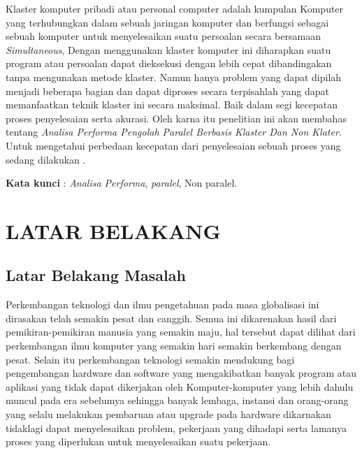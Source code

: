 \documentclass{jtetiproposalskripsi}
\begin{document}
\cover

\approvalpage


\begin{abstractind}
Klaster komputer pribadi atau personal computer adalah kumpulan Komputer yang terhubungkan dalam sebuah jaringan komputer dan berfungsi sebagai sebuah komputer untuk menyelesaikan suatu persoalan secara bersamaan \emph{Simultaneous}, Dengan menggunakan klaster komputer ini diharapkan suatu program atau persoalan dapat dieksekusi dengan lebih cepat dibandingakan tanpa mengunakan metode klaster. Namun hanya problem yang dapat dipilah menjadi beberapa bagian dan dapat diproses secara terpisahlah yang dapat memanfaatkan teknik klaster ini secara maksimal. Baik dalam segi kecepatan proses penyelesaian serta akurasi. Oleh karna itu penelitian ini akan membahas tentang \emph{Analisa Performa Pengolah Paralel Berbasis Klaster Dan Non Klater}. Untuk mengetahui perbedaan kecepatan dari penyelesaian sebuah proses yang sedang dilakukan .


\bigskip
\textbf{Kata kunci} : \emph{Analisa Performa}, \emph{paralel}, Non paralel.
\end{abstractind}

\tableofcontents
{}
\clearpage{}\setcounter{page}{1}

\chapter{LATAR BELAKANG}

\section{Latar Belakang Masalah}
Perkembangan teknologi dan ilmu pengetahuan pada masa globalisasi ini dirasakan telah semakin pesat dan canggih. Semua ini dikarenakan hasil dari pemikiran-pemikiran manusia yang semakin maju, hal  tersebut dapat dilihat dari perkembangan ilmu komputer yang semakin hari semakin berkembang dengan pesat. Selain itu perkembangan teknologi semakin mendukung bagi pengembangan hardware dan software yang mengakibatkan banyak program atau aplikasi yang tidak dapat dikerjakan oleh Komputer-komputer yang lebih dahulu muncul pada era sebelumya sehingga banyak lembaga, instansi dan orang-orang yang selalu melakukan pembaruan atau upgrade pada hardware dikarnakan tidaklagi dapat menyelesaikan problem, pekerjaan yang dihadapi serta lamanya proses yang diperlukan untuk menyelesaikan suatu pekerjaan.
\end{document}

